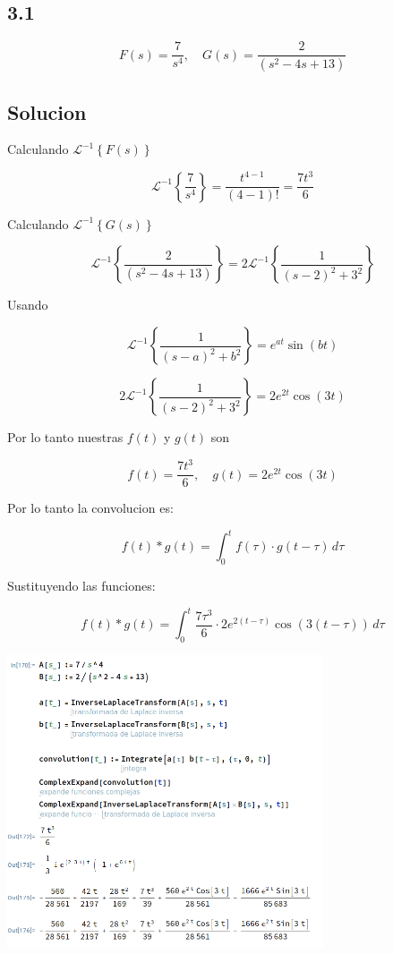 \documentclass{article}
\begin{document}
\subsection{3.1}
\[
    F(s) = \frac{7}{s^4}, \quad G(s) = \frac{2}{(s^2-4s+13)}
\]
\subsection*{Solucion}

Calculando $\mathcal{L}^{-1}\left\{F(s)\right\} $

\[
    \mathcal{L}^{-1}\left\{\frac{7}{s^4}\right\} = \frac{t^{4-1}}{(4-1)!} = \frac{7t^3}{6}
\]

Calculando $\mathcal{L}^{-1}\left\{G(s)\right\} $

\[
    \mathcal{L}^{-1}\left\{\frac{2}{(s^2-4s+13)}\right\} = 2\mathcal{L}^{-1}\left\{\frac{1}{(s-2)^2+3^2}\right\}
\]

Usando

\[
    \mathcal{L}^{-1}\left\{ \frac{1}{(s - a)^2 + b^2} \right\} = e^{at} \sin(bt)
\]

\[
    2\mathcal{L}^{-1}\left\{\frac{1}{(s-2)^2+3^2}\right\} =  2 e^{2t} \cos(3t)
\]

Por lo tanto nuestras $f(t)$ y $g(t)$ son

\[
    f(t) = \frac{7t^3}{6}, \quad g(t) =2 e^{2t} \cos(3t)
\]

Por lo tanto la convolucion es:

\[
    f(t) \ast g(t) = \int_{0}^{t} f(\tau) \cdot g(t - \tau) \, d\tau
\]

Sustituyendo las funciones:

\[
    f(t) \ast g(t) = \int_{0}^{t} \frac{7\tau^3}{6} \cdot 2 e^{2(t - \tau)} \cos(3(t - \tau)) \, d\tau
\]

\begin{center}
    \includegraphics[width=0.7\textwidth]{./image4.png}
\end{center}
\end{document}
